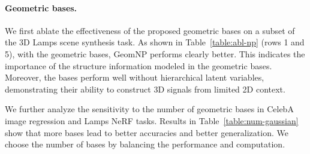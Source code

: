 \begin{table}[htbp]
\caption{\textbf{Sensitivity to the number of geometric bases} on NeRF and image regression.}
\label{table:num-gaussian}
\end{table}

\paragraph{Geometric bases.} We first ablate 
the effectiveness of the proposed geometric
bases on a subset of the
3D Lamps scene synthesis task. As shown in Table~\ref{table:abl-np} (rows 1 and 5),
with the geometric bases, GeomNP performs
clearly better. This indicates the importance of
the structure information modeled in the geometric
bases. Moreover, the bases perform well without hierarchical
latent variables, demonstrating their
ability to construct 3D signals from limited 2D context. %


We further analyze the sensitivity to the number of geometric bases in CelebA image regression and Lamps NeRF tasks.  
Results in Table~\ref{table:num-gaussian} show that more bases lead to better accuracies and better generalization.
We choose the number of bases by balancing the performance and computation.



